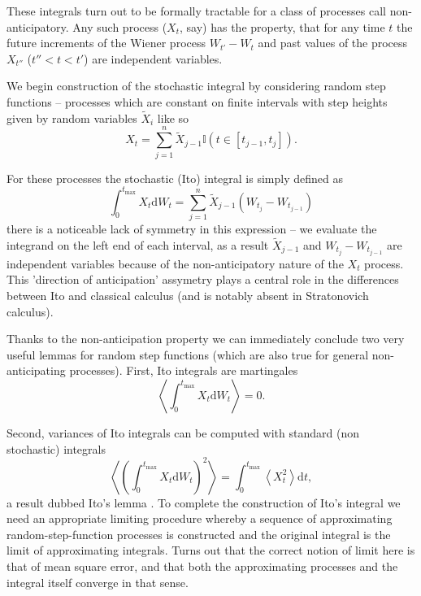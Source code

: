 \documentclass{doctoral}
\newcommand{\dd}{\mathrm{d}}
\begin{document}
These integrals turn out to be formally tractable for a class of processes call non-anticipatory. Any such process ($X_t$, say) has the property, that for any time $t$ the future increments of the Wiener process $W_{t'} - W_t$ and past values of the process $X_{t''}$ ($t'' < t < t'$) are independent variables.

We begin construction of the stochastic integral by considering random step functions -- processes which are constant on finite intervals with step heights given by random variables $\widetilde{X}_{i}$ like so
\begin{equation}
    X_t = \sum_{j=1}^{n} \widetilde{X}_{j-1} \mathbb{I}(t \in [t_{j-1},t_j]).
    \label{eqn:random-step-function}
\end{equation}

For these processes the stochastic (Ito) integral is simply defined as 
\begin{equation}
    \int_0^{t_{\mathrm{max}}} X_t \dd W_t = \sum_{j=1}^{n} \widetilde{X}_{j-1} (W_{t_j} - W_{t_{j-1}})
    \label{eqn:ito-integral-step-function}
\end{equation}
there is a noticeable lack of symmetry in this expression -- we evaluate the integrand on the left end of each interval, as a result $\widetilde{X}_{j-1}$ and $W_{t_j} - W_{t_{j-1}}$ are independent variables because of the non-anticipatory nature of the $X_t$ process. This 'direction of anticipation' assymetry plays a central role in the differences between Ito and classical calculus (and is notably absent in Stratonovich calculus).

Thanks to the non-anticipation property we can immediately conclude two very useful lemmas for random step functions (which are also true for general non-anticipating processes). First, Ito integrals are martingales
\begin{equation}
    \left< \int_0^{t_{\mathrm{max}}} X_t \dd W_t \right> = 0.
    \label{eqn:ito-integrals-are-martingales}
\end{equation}

Second, variances of Ito integrals can be computed with standard (non stochastic) integrals
\begin{equation}
    \left< \left( \int_0^{t_{\mathrm{max}}} X_t \dd W_t \right)^2 \right> = \int_{0}^{t_{\mathrm{max}}} \left< X_t^2 \right> \dd t,
    \label{eqn:itos-lemma}
\end{equation}
a result dubbed Ito's lemma \cite{Ito_1951}. To complete the construction of Ito's integral we need an appropriate limiting procedure whereby a sequence of approximating random-step-function processes is constructed and the original integral is the limit of approximating integrals. Turns out that the correct notion of limit here is that of mean square error, and that both the approximating processes and the integral itself converge in that sense.
\end{document}
